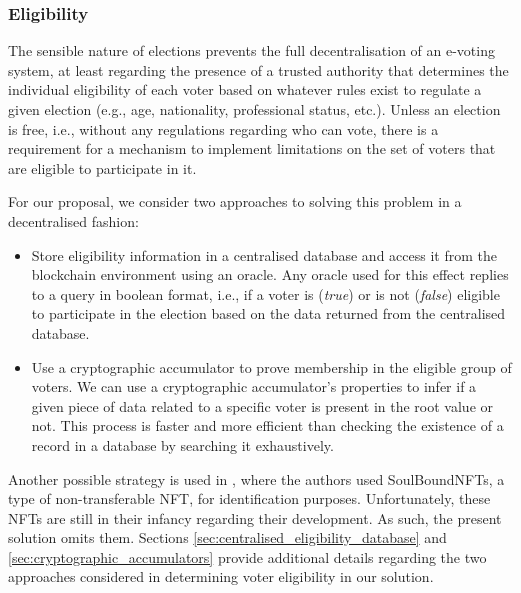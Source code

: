 \documentclass[../main.tex]{subfiles}
\begin{document}
\subsubsection{Eligibility}
\label{sec:voter_eligibility}
The sensible nature of elections prevents the full decentralisation of an e-voting system, at least regarding the presence of a trusted authority that determines the individual eligibility of each voter based on whatever rules exist to regulate a given election (e.g., age, nationality, professional status, etc.). Unless an election is free, i.e., without any regulations regarding who can vote, there is a requirement for a mechanism to implement limitations on the set of voters that are eligible to participate in it.
\par
For our proposal, we consider two approaches to solving this problem in a decentralised fashion:
\begin{itemize}

    \item{Store eligibility information in a centralised database and access it from the blockchain environment using an oracle. Any oracle used for this effect replies to a query in boolean format, i.e., if a voter is (\textit{true})} or is not (\textit{false}) eligible to participate in the election based on the data returned from the centralised database.

    \item{Use a cryptographic accumulator to prove membership in the eligible group of voters. We can use a cryptographic accumulator's properties to infer if a given piece of data related to a specific voter is present in the root value or not. This process is faster and more efficient than checking the existence of a record in a database by searching it exhaustively.}

\end{itemize}

Another possible strategy is used in \cite{Sagar2023}, where the authors used SoulBoundNFTs, a type of non-transferable NFT, for identification purposes. Unfortunately, these NFTs are still in their infancy regarding their development. As such, the present solution omits them. Sections \ref{sec:centralised_eligibility_database} and \ref{sec:cryptographic_accumulators} provide additional details regarding the two approaches considered in determining voter eligibility in our solution.
\end{document}
